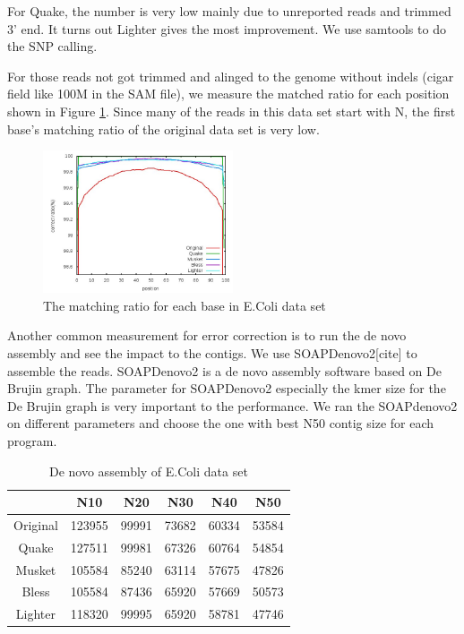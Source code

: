 \documentclass[10pt]{article}
\begin{document}
For Quake, the number is very low mainly due to unreported reads and trimmed 3' end. It turns out Lighter gives the most improvement. We use samtools to do the SNP calling. 

For those reads not got trimmed and alinged to the genome without indels (cigar field like 100M in the SAM file), we measure the matched ratio for each position shown in Figure \ref{fig:ecoli_perbase}. Since many of the reads in this data set start with N, the first base's matching ratio of the original data set is very low.

\begin{figure}[h!]
\begin{center}
\includegraphics[width=0.5\textwidth]{per_base.jpg}
\caption{The matching ratio for each base in E.Coli data set\label{fig:ecoli_perbase}}
\end{center}
\end{figure}

Another common measurement for error correction is to run the de novo assembly and see the impact to the contigs. We use SOAPDenovo2[cite] to assemble the reads. SOAPDenovo2 is a de novo assembly software based on De Brujin graph. The parameter for SOAPDenovo2 especially the kmer size for the De Brujin graph is very important to the performance. We ran the SOAPdenovo2 on different parameters and choose the one with best N50 contig size for each program. 

\begin{table}
\begin{tabular}{|c|c|c|c|c|c|} \hline
 		& N10 & N20 & N30 & N40 & N50 \\ \hline
Original	&			123955	&99991	&73682	&60334	&53584 \\ \hline
Quake		&		127511	&99981	&67326	&60764	&54854 \\ \hline
Musket		&		105584	&85240	&63114	&57675	&47826 \\ \hline
Bless		&		105584	&87436	&65920	&57669	&50573 \\ \hline
Lighter		&		118320	&99995	&65920	&58781	&47746 \\ \hline
\end{tabular}
\caption{De novo assembly of E.Coli data set\label{table:ecoli_sd2}}
\end{table}
\end{document}
